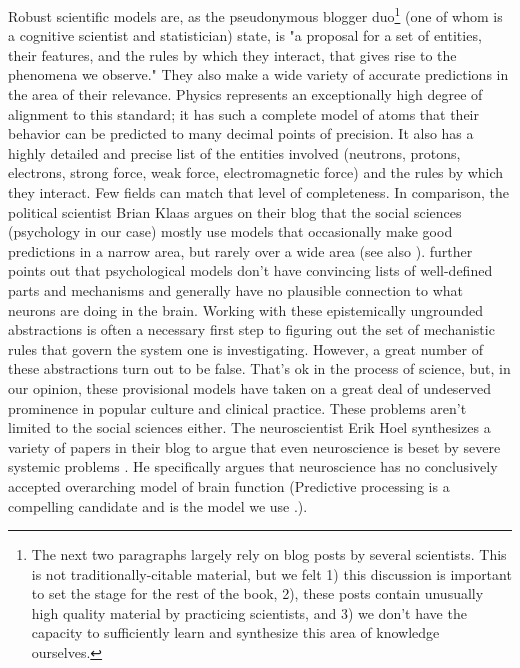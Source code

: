 \documentclass[12pt,letterpaper]{book}
\begin{document}
Robust scientific models are, as the pseudonymous blogger duo\footnote{The next two paragraphs largely rely on blog posts by several scientists. This is not traditionally-citable material, but we felt 1) this discussion is important to set the stage for the rest of the book, 2), these posts contain unusually high quality material by practicing scientists, and 3) we don't have the capacity to sufficiently learn and synthesize this area of knowledge ourselves.} \textcite{mechanisticModels} (one of whom is a cognitive scientist and statistician) state, is "a proposal for a set of entities, their features, and the rules by which they interact, that gives rise to the phenomena we observe." They also make a wide variety of accurate predictions in the area of their relevance. Physics represents an exceptionally high degree of alignment to this standard; it has such a complete model of atoms that their behavior can be predicted to many decimal points of precision. It also has a highly detailed and precise list of the entities involved (neutrons, protons, electrons, strong force, weak force, electromagnetic force) and the rules by which they interact. Few fields can match that level of completeness. In comparison, the political scientist Brian Klaas argues on their blog that the social sciences (psychology in our case) mostly use models that occasionally make good predictions in a narrow area, but rarely over a wide area \cite{zombieSocialScience} (see also \textcite{evidenceBasedPolicy}). \textcite{mechanisticModels} further points out that psychological models don't have convincing lists of well-defined parts and mechanisms and generally have no plausible connection to what neurons are doing in the brain. Working with these epistemically ungrounded abstractions is often a necessary first step to figuring out the set of mechanistic rules that govern the system one is investigating. However, a great number of these abstractions turn out to be false. That’s ok in the process of science, but, in our opinion, these provisional models have taken on a great deal of undeserved prominence in popular culture and clinical practice. These problems aren't limited to the social sciences either. The neuroscientist Erik Hoel synthesizes a variety of papers in their blog to argue that even neuroscience is beset by severe systemic problems \cite{hoelNeuroscience}. He specifically argues that neuroscience has no conclusively accepted overarching model of brain function (Predictive processing is a compelling candidate and is the model we use \cite{clark2015surfing}.).
\end{document}

